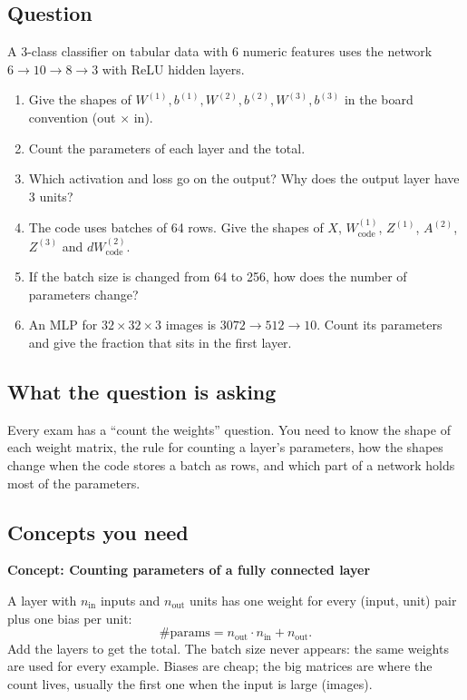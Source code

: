 \documentclass[12pt,a4paper]{article}
\newcommand{\concept}[2]{\par\medskip\phantomsection\label{#1}{\large\bfseries\color{blue!50!black} Concept: #2}\par}
\newcommand{\hlq}[1]{{\setlength{\fboxsep}{1.5pt}\colorbox{yellow}{#1}}}
\begin{document}
\subsection*{Question}
A 3-class classifier on tabular data with 6 numeric features uses the network $6\to10\to8\to3$ with ReLU hidden layers.
\begin{enumerate}[label=(\alph*)]
\item[\hlq{(a)}] Give the shapes of $W^{(1)},b^{(1)},W^{(2)},b^{(2)},W^{(3)},b^{(3)}$ in the board convention (out $\times$ in).
\item[\hlq{(b)}] Count the parameters of each layer and the total.
\item[(c)] Which activation and loss go on the output? Why does the output layer have 3 units?
\item[\hlq{(d)}] The code uses batches of 64 rows. Give the shapes of $X$, $W^{(1)}_{\text{code}}$, $Z^{(1)}$, $A^{(2)}$, $Z^{(3)}$ and $dW^{(2)}_{\text{code}}$.
\item[(e)] If the batch size is changed from 64 to 256, how does the number of parameters change?
\item[\hlq{(f)}] An MLP for $32\times32\times3$ images is $3072\to512\to10$. Count its parameters and give the fraction that sits in the first layer.
\end{enumerate}

\subsection*{What the question is asking}
Every exam has a ``count the weights'' question. You need to know the shape of each weight matrix, the rule for counting a layer's parameters, how the shapes change when the code stores a batch as rows, and which part of a network holds most of the parameters.

\subsection*{Concepts you need}

\concept{c:paramcount}{Counting parameters of a fully connected layer}
A layer with $n_{\text{in}}$ inputs and $n_{\text{out}}$ units has one weight for every (input, unit) pair plus one bias per unit:
\[
\#\text{params}=n_{\text{out}}\cdot n_{\text{in}}+n_{\text{out}} .
\]
Add the layers to get the total. The batch size never appears: the same weights are used for every example. Biases are cheap; the big matrices are where the count lives, usually the first one when the input is large (images).
\end{document}
